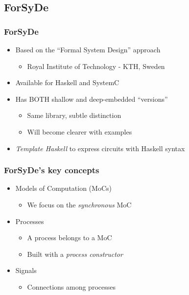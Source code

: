     \subsection{ForSyDe}
    \label{subsec:forsyde}
        \begin{frame}
            \frametitle{ForSyDe}

            \begin{itemize}
                \item Based on the ``Formal System Design'' approach
                    \begin{itemize}
                        \item Royal Institute of Technology - KTH, Sweden
                    \end{itemize}
                \item Available for Haskell and SystemC
                \item Has BOTH shallow and deep-embedded ``versions''
                    \begin{itemize}
                        \item Same library, subtle distinction
                        \item Will become clearer with examples
                    \end{itemize}
                \item \emph{Template Haskell} to express circuits with Haskell syntax
            \end{itemize}
        \end{frame}

        \begin{frame}
            \frametitle{ForSyDe's key concepts}

            \begin{itemize}
                \item Models of Computation (MoCs)
                    \begin{itemize}
                        \item We focus on the \emph{synchronous} MoC
                    \end{itemize}
                \item Processes
                    \begin{itemize}
                        \item A process belongs to a MoC
                        \item Built with a \emph{process constructor}
                    \end{itemize}
                \item Signals
                    \begin{itemize}
                        \item Connections among processes
                    \end{itemize}
            \end{itemize}
        \end{frame}

